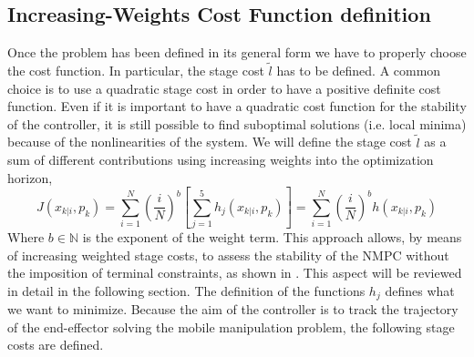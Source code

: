 \subsection{Increasing-Weights Cost Function definition}

Once the problem has been defined in its general form we have to properly choose the cost function. In particular, the stage cost $\tilde{l}$ has to be defined. A common choice is to use a quadratic stage cost in order to have a positive definite cost function. Even if it is important to have a quadratic cost function for the stability of the controller, it is still possible to find suboptimal solutions (i.e. local minima) because of the nonlinearities of the system. We will define the stage cost $\tilde{l}$ as a sum of different contributions using increasing weights into the optimization horizon, 
\begin{equation}\label{costfunctionh}
J({x}_{k|i},p_k)=\sum_{i=1}^{N}\left(\frac{i}{N}\right)^b \left[ \sum_{j=1}^{5} h_j({x}_{k|i},p_k) \right]=\sum_{i=1}^{N}\left(\frac{i}{N}\right)^b h({x}_{k|i},p_k)
\end{equation} 
Where $b \in \mathbb{N}$ is the exponent of the weight term. This approach allows, by means of increasing weighted stage costs, to assess the stability of the NMPC without the imposition of terminal constraints, as shown in \cite{alamir2018stability}. This aspect will be reviewed in detail in the following section.
The definition of the functions $h_j$ defines what we want to minimize. Because the aim of the controller is to track the trajectory of the end-effector solving the mobile manipulation problem, the following stage costs are defined.
